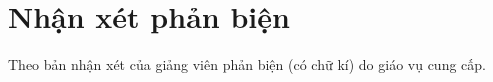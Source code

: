 \chapter*{Nhận xét phản biện}
\label{thanks}

Theo bản nhận xét của giảng viên phản biện (có chữ kí) do giáo vụ cung cấp.